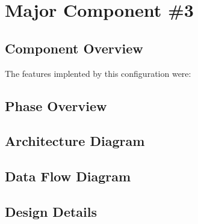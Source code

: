 \section{Major Component \#3 }


\subsection{Component  Overview}
The features implented by this configuration were:


\subsection{Phase Overview}

\subsection{ Architecture  Diagram}


\subsection{Data Flow Diagram}


\subsection{Design Details}

